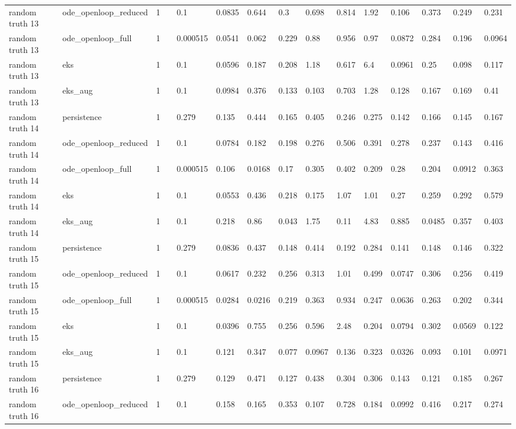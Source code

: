 \begin{table}[t]
\begin{tabular}{lllllllllllllll}
random truth 13 & ode\_openloop\_reduced & 1 &  & 0.1 & 0.0835 & 0.644 & 0.3 & 0.698 & 0.814 & 1.92 & 0.106 & 0.373 & 0.249 & 0.231 \\
random truth 13 & ode\_openloop\_full & 1 &  & 0.000515 & 0.0541 & 0.062 & 0.229 & 0.88 & 0.956 & 0.97 & 0.0872 & 0.284 & 0.196 & 0.0964 \\
random truth 13 & eks & 1 &  & 0.1 & 0.0596 & 0.187 & 0.208 & 1.18 & 0.617 & 6.4 & 0.0961 & 0.25 & 0.098 & 0.117 \\
random truth 13 & eks\_aug & 1 &  & 0.1 & 0.0984 & 0.376 & 0.133 & 0.103 & 0.703 & 1.28 & 0.128 & 0.167 & 0.169 & 0.41 \\
random truth 14 & persistence & 1 &  & 0.279 & 0.135 & 0.444 & 0.165 & 0.405 & 0.246 & 0.275 & 0.142 & 0.166 & 0.145 & 0.167 \\
random truth 14 & ode\_openloop\_reduced & 1 &  & 0.1 & 0.0784 & 0.182 & 0.198 & 0.276 & 0.506 & 0.391 & 0.278 & 0.237 & 0.143 & 0.416 \\
random truth 14 & ode\_openloop\_full & 1 &  & 0.000515 & 0.106 & 0.0168 & 0.17 & 0.305 & 0.402 & 0.209 & 0.28 & 0.204 & 0.0912 & 0.363 \\
random truth 14 & eks & 1 &  & 0.1 & 0.0553 & 0.436 & 0.218 & 0.175 & 1.07 & 1.01 & 0.27 & 0.259 & 0.292 & 0.579 \\
random truth 14 & eks\_aug & 1 &  & 0.1 & 0.218 & 0.86 & 0.043 & 1.75 & 0.11 & 4.83 & 0.885 & 0.0485 & 0.357 & 0.403 \\
random truth 15 & persistence & 1 &  & 0.279 & 0.0836 & 0.437 & 0.148 & 0.414 & 0.192 & 0.284 & 0.141 & 0.148 & 0.146 & 0.322 \\
random truth 15 & ode\_openloop\_reduced & 1 &  & 0.1 & 0.0617 & 0.232 & 0.256 & 0.313 & 1.01 & 0.499 & 0.0747 & 0.306 & 0.256 & 0.419 \\
random truth 15 & ode\_openloop\_full & 1 &  & 0.000515 & 0.0284 & 0.0216 & 0.219 & 0.363 & 0.934 & 0.247 & 0.0636 & 0.263 & 0.202 & 0.344 \\
random truth 15 & eks & 1 &  & 0.1 & 0.0396 & 0.755 & 0.256 & 0.596 & 2.48 & 0.204 & 0.0794 & 0.302 & 0.0569 & 0.122 \\
random truth 15 & eks\_aug & 1 &  & 0.1 & 0.121 & 0.347 & 0.077 & 0.0967 & 0.136 & 0.323 & 0.0326 & 0.093 & 0.101 & 0.0971 \\
random truth 16 & persistence & 1 &  & 0.279 & 0.129 & 0.471 & 0.127 & 0.438 & 0.304 & 0.306 & 0.143 & 0.121 & 0.185 & 0.267 \\
random truth 16 & ode\_openloop\_reduced & 1 &  & 0.1 & 0.158 & 0.165 & 0.353 & 0.107 & 0.728 & 0.184 & 0.0992 & 0.416 & 0.217 & 0.274 \\

\end{tabular}
\end{table}
